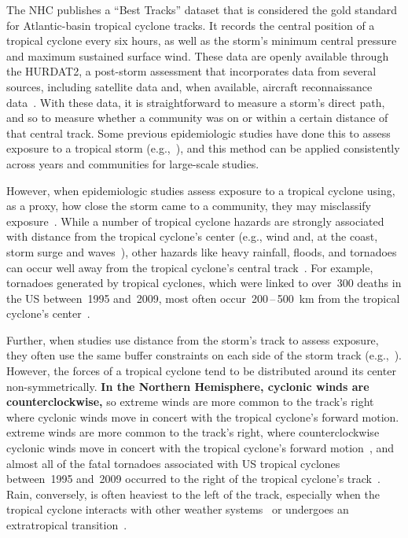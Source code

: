 The \ac{NHC} publishes a ``Best Tracks'' dataset that is considered the gold
standard for Atlantic-basin tropical cyclone tracks.  It records the central
position of a tropical cyclone every six hours, as well as the storm's minimum
central pressure and maximum sustained surface wind.  These data are openly
available through the \ac{HURDAT2}, a post-storm assessment that incorporates
data from several sources, including satellite data and, when available,
aircraft reconnaissance data~\parencite{landsea2013, jarvinen1988}.  With these
data, it is straightforward to measure a storm's direct path, and so to measure
whether a community was on or within a certain distance of that central track.
Some previous epidemiologic studies have done this to assess exposure to a
tropical storm (e.g.,~\cite{currie2013, kinney2008, caillouet2008increase}), 
and this method can be applied consistently across years and communities 
for large-scale studies.

However, when epidemiologic studies assess exposure to a tropical cyclone
using, as a proxy, how close the storm came to a community, they may
misclassify exposure~\parencite{grabich2015measuring}. While a number of
tropical cyclone hazards are strongly associated with distance from the
tropical cyclone's center (e.g., wind and, at the coast, storm surge and
waves~\parencite{rappaport2000, kruk2010}), other hazards like heavy rainfall,
floods, and tornadoes can occur well away from the tropical cyclone's central
track~\parencite{rappaport2000, atallah2007, moore2012}.  For example,
tornadoes generated by tropical cyclones, which were linked to over~300 deaths
in the \ac{US} between~1995 and~2009, most often
occur~200\,--\,500~\si{\kilo\metre} from the tropical cyclone's
center~\parencite{moore2012}.  

Further, when studies use distance from the storm's track to assess exposure,
they often use the same buffer constraints on each side of the storm track
(e.g.,~\cite{kinney2008, currie2013}).  However, the forces of a tropical
cyclone tend to be distributed around its center non-symmetrically.  \textbf{In
the Northern Hemisphere, cyclonic winds are counterclockwise,} so extreme
winds are more common to the track's right where cyclonic winds move in
concert with the tropical cyclone's forward motion. extreme winds are more
common to the track's right, where counterclockwise cyclonic winds move in
concert with the tropical cyclone's forward motion~\parencite{halverson2015},
and almost all of the fatal tornadoes associated with \ac{US} tropical cyclones
between~1995 and~2009 occurred to the right of the tropical cyclone's
track~\parencite{moore2012}.  Rain, conversely, is often heaviest to the left
of the track, especially when the tropical cyclone interacts with other weather
systems~\parencite{atallah2003, atallah2007, zhu2013variations} or undergoes an
extratropical transition~\parencite{elsberry2002}.  

